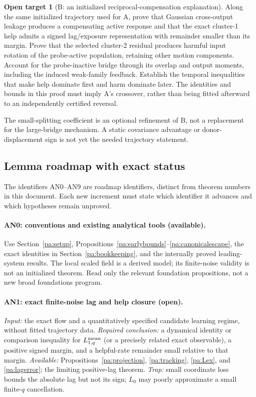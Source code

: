 \documentclass[11pt]{article}
\numberwithin{equation}{section}
\theoremstyle{definition}
\newtheorem{target}{Open target}[section]
\theoremstyle{remark}
\newcommand{\1}{\mathbf 1}
\begin{document}
\begin{target}[B: an initialized reciprocal-compensation explanation]
\label{pa:targetB}
Along the same initialized trajectory used for A, prove that Gaussian
cross-output leakage produces a compensating active response and that the
exact cluster-1 help admits a signed lag/exposure representation with
remainder smaller than its margin. Prove that the selected cluster-2
residual produces harmful input rotation of the probe-active population,
retaining other motion components. Account for the probe-inactive bridge
through its overlap and output moments, including the induced weak-family
feedback. Establish the temporal inequalities that make help dominate
first and harm dominate later. The identities and bounds in this proof
must imply A's crossover, rather than being fitted afterward to an
independently certified reversal.
\end{target}
The small-splitting coefficient is an optional refinement of B, not a
replacement for the large-bridge mechanism. A static covariance advantage
or donor-displacement sign is not yet the needed trajectory statement.

\subsection{Lemma roadmap with exact status}
The identifiers AN0--AN9 are roadmap identifiers, distinct from theorem
numbers in this document. Each new increment must state which identifier
it advances and which hypotheses remain unproved.

\paragraph{AN0: conventions and existing analytical tools (available).}
Use Section~\ref{pa:setup}, Propositions~\ref{pa:earlybounds}--\ref{pa:canonicalescape},
the exact identities in Section~\ref{pa:bookkeeping}, and the internally
proved leading-system results. The local scaled field is a derived model;
its finite-noise validity is not an initialized theorem. Read only the
relevant foundation propositions, not a new broad foundations program.

\paragraph{AN1: exact finite-noise lag and help closure (open).}
\emph{Input:} the exact flow and a quantitatively specified candidate
learning regime, without fitted trajectory data.
\emph{Required conclusion:} a dynamical identity or comparison inequality
for $L_{1,q}^{\rm mean}$ (or a precisely related exact observable), a positive
signed margin, and a helpful-rate remainder small relative to that margin.
\emph{Available:} Propositions~\ref{pa:projection}, \ref{pa:tracking},
\ref{pa:Lex}, and \ref{pa:lagerror}; the limiting positive-lag theorem.
\emph{Trap:} small coordinate loss bounds the absolute lag but not its sign;
$L_0$ may poorly approximate a small finite-$q$ cancellation.
\end{document}
